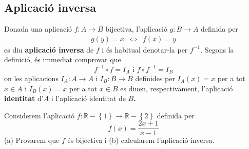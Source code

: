 \subsection{Aplicaci\'{o} inversa}

Donada una aplicaci\'{o} $f:A\longrightarrow B$ bijectiva, l'aplicaci\'{o} $%
g:B\longrightarrow A$ definida per
\begin{equation*}
\begin{array}{ccc}
g(y)=x & \Longleftrightarrow & f(x)=y%
\end{array}
\end{equation*}
es diu \textbf{aplicaci\'{o} inversa} de $f$ i \'{e}s habitual denotar-la
per $f^{-1}$. Segons la definici\'{o}, \'{e}s immediat comprovar que%
\begin{equation*}
f^{-1}\circ f=I_{A}\text{ \ \ i \ \ }f\circ f^{-1}=I_{B}
\end{equation*}
on les aplicacions $I_{A}:A\longrightarrow A$ i $I_{B}:B\longrightarrow B$
definides per $I_{A}(x)=x$ per a tot $x\in A$ i $I_{B}(x)=x$ per a tot $x\in
B$ es diuen, respectivament, l'aplicaci\'{o} \textbf{identitat} d'$A$ i
l'aplicaci\'{o} identitat de $B$\textbf{. }

\begin{exem}
Considerem l'aplicaci\'{o} $f:\mathbb{R}-\left\{ 1\right\} \longrightarrow
\mathbb{R}-\left\{ 2\right\} $ definida per%
\begin{equation*}
f(x)=\frac{2x+1}{x-1}
\end{equation*}
(a) Provarem que $f$ \'{e}s bijectiva i (b) calcularem l'aplicaci\'{o}
inversa.
\end{exem}

